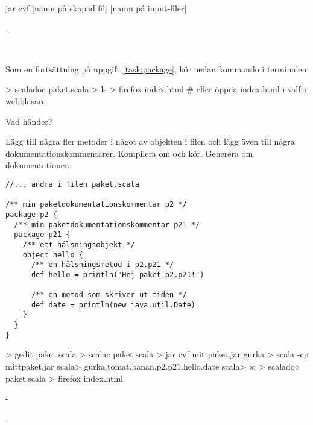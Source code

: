 \SOLUTION


\TaskSolved \what


\SubtaskSolved  jar cvf [namn på skapad fil] [namn på input-filer]

\SubtaskSolved  -



\QUESTEND









\QUESTBEGIN

\Task  \what~

\Subtask Som en fortsättning på uppgift \ref{task:package}, kör nedan kommando i terminalen:

\begin{REPL}
> scaladoc paket.scala
> ls
> firefox index.html   # eller öppna index.html i valfri webbläsare
\end{REPL}

Vad händer?

\Subtask Lägg till några fler metoder i något av objekten i filen  och lägg även till några dokumentationskommentarer. Kompilera om och kör. Generera om dokumentationen.

\begin{verbatim}
//... ändra i filen paket.scala

/** min paketdokumentationskommentar p2 */
package p2 {
  /** min paketdokumentationskommentar p21 */
  package p21 {
    /** ett hälsningsobjekt */
    object hello {
      /** en hälsningsmetod i p2.p21 */
      def hello = println("Hej paket p2.p21!")

      /** en metod som skriver ut tiden */
      def date = println(new java.util.Date)
    }
  }
}

\end{verbatim}

\begin{REPL}
> gedit paket.scala
> scalac paket.scala
> jar cvf mittpaket.jar gurka
> scala -cp mittpaket.jar
scala> gurka.tomat.banan.p2.p21.hello.date
scala> :q
> scaladoc paket.scala
> firefox index.html
\end{REPL}

\SOLUTION


\TaskSolved \what

\SubtaskSolved  -

\SubtaskSolved  -

